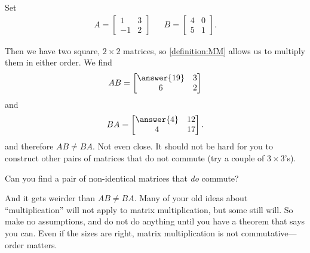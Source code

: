 \documentclass{ximera}
\begin{document}
\begin{example}%

  Set
  \begin{align*}
    A=
    \begin{bmatrix}
      1 & 3\\
      -1 & 2
    \end{bmatrix}
         &&
            B=
            \begin{bmatrix}
              4&0\\
              5&1
            \end{bmatrix}.
  \end{align*}
  
  Then we have two square, $2\times 2$ matrices, so \ref{definition:MM} allows us to multiply them in either order.  We find
  \[
    AB=
    \begin{bmatrix}
      \answer{19} & 3\\
      6 & 2
    \end{bmatrix}
  \]
  and
  \[
    BA=
    \begin{bmatrix}
      \answer{4} & 12\\
      4 & 17
    \end{bmatrix}.
  \]
  and therefore $AB\neq BA$.  Not even close.  It should not be hard
  for you to construct other pairs of matrices that do not commute
  (try a couple of $3\times 3$'s).

  Can you find a pair of non-identical matrices that \textit{do}
  commute?

\end{example}

And it gets weirder than $AB \neq BA$.  Many of your old ideas about
``multiplication'' will not apply to matrix multiplication, but some
still will.  So make no assumptions, and do not do anything until you
have a theorem that says you can.  Even if the sizes are right, matrix
multiplication is not commutative---order matters.
\end{document}
